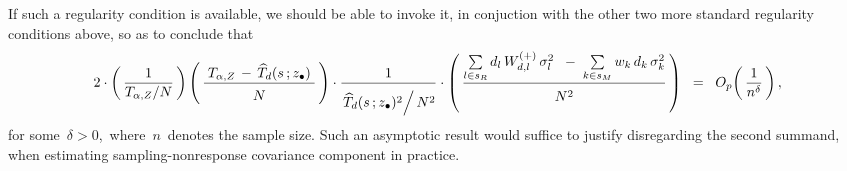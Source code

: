 \begin{itemize}
\begin{itemize}
\begin{equation*}
        \end{equation*}
        If such a regularity condition is available,
        we should be able to invoke it, in conjuction with the other two more standard regularity conditions above,
        so as to conclude that
        \begin{equation*}
        2
        \cdot
        \left(\,
            \dfrac{1}{T_{\alpha,Z} \slash N}
            \,\right)
        \left(\,
            \dfrac{
                {\color{white}.}
                {\color{black}T_{\alpha,Z}} \,-\, \widehat{T}_{d}(s\,;\zdot)
                {\color{white}.}
                }{
                \overset{{\color{white}.}}{
                    N
                    }
                }           
            \,\right)
        \cdot
        \dfrac{
            1
            }{
            \overset{{\color{white}.}}{
                \left. \widehat{T}_{d}(s\,;\zdot)^{2} \right\slash N^{2}
                }
            }
        \cdot
        \left(\,
            \dfrac{
                \underset{l \in s_{R}}{\sum}\,
                d_{l}\,W^{(+)}_{d,l}\,\sigma_{l}^{2}
                \;\;-\;
                \underset{k \in s_{M}}{\sum}\,
                w_{k}\,d_{k}\,\sigma_{k}^{2}
                }{
                \overset{{\color{white}.}}{N^{2}}                
                }
            \,\right)
        \;\; = \;\;
            O_{p}\!\left(\,\dfrac{1}{n^{\delta}}\,\right),
        \end{equation*}
        for some \,$\delta > 0$,\,
        where \,$n$\, denotes the sample size.
        Such an asymptotic result would suffice to justify disregarding the second summand,
        when estimating sampling-nonresponse covariance component in practice.
    \end{itemize}
\end{itemize}

